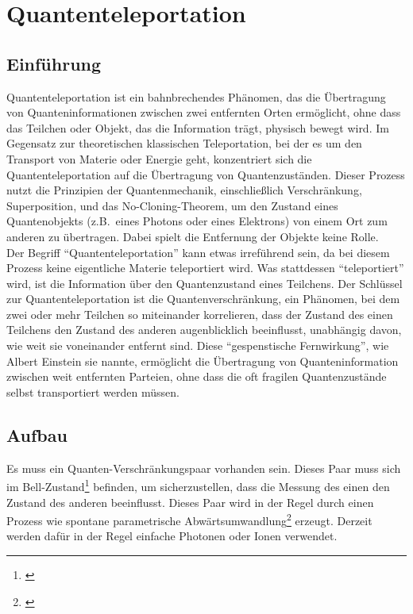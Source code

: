 \section{Quantenteleportation}\label{sec:quantum-teleportation}

\subsection{Einführung}\label{subsec:introduction}
Quantenteleportation ist ein bahnbrechendes Phänomen, das die Übertragung von Quanteninformationen
zwischen zwei entfernten Orten ermöglicht, ohne dass das Teilchen oder Objekt, das die Information trägt, physisch bewegt wird.
Im Gegensatz zur theoretischen klassischen Teleportation, bei der es um den Transport von Materie oder Energie geht,
konzentriert sich die Quantenteleportation auf die Übertragung von Quantenzuständen.
Dieser Prozess nutzt die Prinzipien der Quantenmechanik, einschließlich Verschränkung, Superposition,
und das No-Cloning-Theorem,
um den Zustand eines Quantenobjekts (z.B.\ eines Photons oder eines Elektrons) von einem Ort zum anderen zu übertragen.
Dabei spielt die Entfernung der Objekte keine Rolle.\\

Der Begriff ``Quantenteleportation'' kann etwas irreführend sein, da bei diesem Prozess keine eigentliche Materie teleportiert wird.
Was stattdessen ``teleportiert'' wird, ist die Information über den Quantenzustand eines Teilchens.
Der Schlüssel zur Quantenteleportation ist die Quantenverschränkung,
ein Phänomen, bei dem zwei oder mehr Teilchen so miteinander korrelieren, dass der Zustand des einen Teilchens den Zustand des anderen augenblicklich
 beeinflusst, unabhängig davon, wie weit sie voneinander entfernt sind.
Diese ``gespenstische Fernwirkung'', wie Albert Einstein sie nannte,
ermöglicht die Übertragung von Quanteninformation zwischen weit entfernten Parteien, ohne dass die oft fragilen Quantenzustände selbst transportiert werden müssen.

\subsection{Aufbau}\label{subsec:setup}

Es muss ein Quanten-Verschränkungspaar vorhanden sein.
Dieses Paar muss sich im Bell-Zustand\footnote{\cite{nielsen_quantum_2010}} befinden, um sicherzustellen, dass die Messung des einen den Zustand des anderen beeinflusst.
Dieses Paar wird in der Regel durch einen Prozess wie
spontane parametrische Abwärtsumwandlung\footnote{\cite{couteau_spontaneous_2018}} erzeugt.
Derzeit werden dafür in der Regel einfache Photonen oder Ionen verwendet.\\


